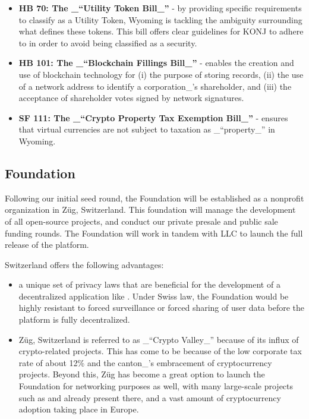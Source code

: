 \documentclass{kwp-builder}
\begin{document}
\begin{itemize}
	\item \textbf{HB 70: The \_{“}Utility Token Bill\_{”}} - by providing specific requirements to classify as a Utility Token, Wyoming is tackling the ambiguity surrounding what defines these tokens. This bill offers clear guidelines for KONJ to adhere to in order to avoid being classified as a security.
	
	\item \textbf{HB 101: The \_{“}Blockchain Fillings Bill\_{”}} - enables the creation and use of blockchain technology for (i) the purpose of storing records, (ii) the use of a network address to identify a corporation\_{’}s shareholder, and (iii) the acceptance of shareholder votes signed by network signatures.
		
	\item \textbf{SF 111: The \_{“}Crypto Property Tax Exemption Bill\_{”}} - ensures that virtual currencies are not subject to taxation as \_{“}property\_{”} in Wyoming.

\end{itemize}
\subsection{\konjure Foundation}

\tab Following our initial seed round, the \konjure Foundation will be established as a nonprofit organization in Züg, Switzerland. This foundation will manage the development of all open-source \konjure projects, and conduct our private presale and public sale funding rounds. The \konjure Foundation will work in tandem with \konjure LLC to launch the full release of the platform.\bigskip

Switzerland offers the following advantages:

\begin{itemize}
	\item a unique set of privacy laws that are beneficial for the development of a decentralized application like \konjure. Under Swiss law, the \konjure Foundation would be highly resistant to forced surveillance or forced sharing of user data before the platform is fully decentralized.
	
	\item Züg, Switzerland is referred to as \_{“}Crypto Valley\_{”} because of its influx of crypto-related projects. This has come to be because of the low corporate tax rate of about 12\% and the canton\_{’}s embracement of cryptocurrency projects. Beyond this, Züg has become a great option to launch the \konjure Foundation for networking purposes as well, with many large-scale projects such as \cardano and \ethereum already present there, and a vast amount of cryptocurrency adoption taking place in Europe.
\end{itemize}
\end{document}
